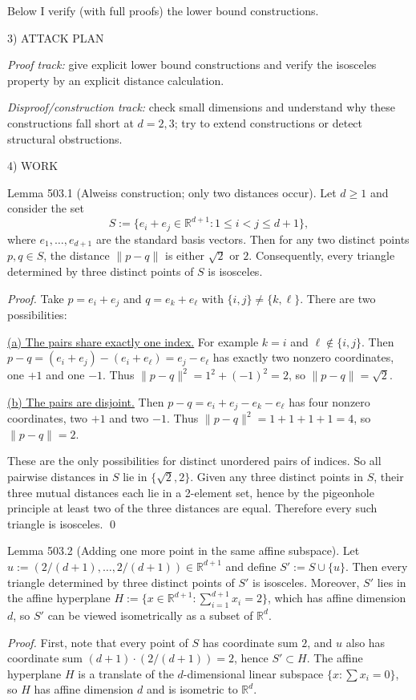 Below I verify (with full proofs) the lower bound constructions.

3) ATTACK PLAN

\emph{Proof track:} give explicit lower bound constructions and verify the isosceles property by an explicit distance calculation.

\emph{Disproof/construction track:} check small dimensions and understand why these constructions fall short at $d=2,3$; try to extend constructions or detect structural obstructions.

4) WORK

Lemma 503.1 (Alweiss construction; only two distances occur).
Let $d\ge 1$ and consider the set
\[
S:=\{e_i+e_j\in\mathbb R^{d+1}: 1\le i<j\le d+1\},
\]
where $e_1,\dots,e_{d+1}$ are the standard basis vectors.
Then for any two distinct points $p,q\in S$, the distance $\lVert p-q\rVert$ is either $\sqrt2$ or $2$.
Consequently, every triangle determined by three distinct points of $S$ is isosceles.

\emph{Proof.}
Take $p=e_i+e_j$ and $q=e_k+e_\ell$ with $\{i,j\}\ne\{k,\ell\}$.
There are two possibilities:

\underline{(a) The pairs share exactly one index.}
For example $k=i$ and $\ell\notin\{i,j\}$.
Then $p-q = (e_i+e_j)-(e_i+e_\ell)=e_j-e_\ell$ has exactly two nonzero coordinates, one $+1$ and one $-1$.
Thus $\lVert p-q\rVert^2=1^2+(-1)^2=2$, so $\lVert p-q\rVert=\sqrt2$.

\underline{(b) The pairs are disjoint.}
Then $p-q=e_i+e_j-e_k-e_\ell$ has four nonzero coordinates, two $+1$ and two $-1$.
Thus $\lVert p-q\rVert^2=1+1+1+1=4$, so $\lVert p-q\rVert=2$.

These are the only possibilities for distinct unordered pairs of indices.
So all pairwise distances in $S$ lie in $\{\sqrt2,2\}$.
Given any three distinct points in $S$, their three mutual distances each lie in a 2-element set, hence by the pigeonhole principle at least two of the three distances are equal. Therefore every such triangle is isosceles.
\qed

Lemma 503.2 (Adding one more point in the same affine subspace).
Let $u:=(2/(d+1),\dots,2/(d+1))\in\mathbb R^{d+1}$ and define $S' := S\cup\{u\}$.
Then every triangle determined by three distinct points of $S'$ is isosceles.
Moreover, $S'$ lies in the affine hyperplane $H:=\{x\in\mathbb R^{d+1}: \sum_{i=1}^{d+1} x_i=2\}$, which has affine dimension $d$, so $S'$ can be viewed isometrically as a subset of $\mathbb R^d$.

\emph{Proof.}
First, note that every point of $S$ has coordinate sum $2$, and $u$ also has coordinate sum $(d+1)\cdot (2/(d+1))=2$, hence $S'\subset H$.
The affine hyperplane $H$ is a translate of the $d$-dimensional linear subspace $\{x: \sum x_i=0\}$, so $H$ has affine dimension $d$ and is isometric to $\mathbb R^d$.

